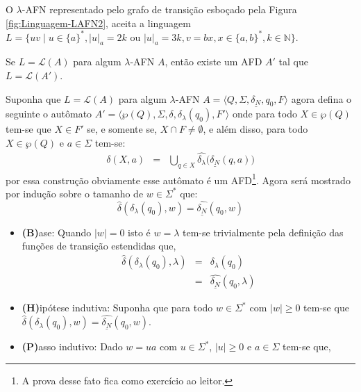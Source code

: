 \begin{exemplo}\label{exe:LinguagemLAFN2}
	O $\lambda$-AFN representado pelo grafo de transição esboçado pela Figura \ref{fig:Linguagem-LAFN2}, aceita a linguagem $L = \{uv \mid u \in \{a\}^*, |u|_a = 2k\text{ ou } |u|_a = 3k, v=bx, x \in \{a,b\}^*, k \in \mathbb{N}\}$.
\end{exemplo}

\begin{teorema}\label{teo:LAFN-AFD}
	Se $L = \mathcal{L}(A)$ para algum $\lambda$-AFN $A$, então existe um  AFD $A'$ tal que $L = \mathcal{L}(A')$.
\end{teorema}

\begin{prova}
  Suponha que $L = \mathcal{L}(A)$ para algum $\lambda$-AFN $A =  \langle Q, \Sigma, \underline{\delta_N}, q_0, F \rangle$ agora defina o seguinte o autômato $A' = \langle \wp(Q), \Sigma, \delta, \delta_\lambda(q_0), F' \rangle$ onde para todo $X \in \wp(Q)$ tem-se que $X \in F'$ se, e somente se, $X \cap F \neq \emptyset$, e além disso, para todo $X \in \wp(Q)$ e $a \in \Sigma$ tem-se:
	\begin{eqnarray}\label{eq:LAFN-AFD}
		\delta(X, a) & = & \bigcup_{q \in X} \widehat{\delta_\lambda}\Big(\underline{\delta_N}(q, a)\Big)
	\end{eqnarray}
	por essa construção obviamente esse autômato é um AFD\footnote{A prova desse fato fica como exercício ao leitor.}. Agora será mostrado por indução sobre o tamanho de $w \in \Sigma^*$ que:
	$$\widehat{\delta}(\delta_\lambda(q_0), w) = \widehat{\underline{\delta_N}}(q_0, w)$$
  \begin{itemize}
    \item[ ] \textbf{(B)}ase: Quando $|w| = 0$ isto é $w = \lambda$ tem-se trivialmente pela definição das funções de transição estendidas que, 
		\begin{eqnarray*}
			\widehat{\delta}(\delta_\lambda(q_0), \lambda) & = & \delta_\lambda(q_0)\\
			& = & \widehat{\underline{\delta_N}}(q_0, \lambda)
		\end{eqnarray*}
    \item[ ] \textbf{(H)}ipótese indutiva: Suponha que para todo $w \in \Sigma^*$ com $|w| \geq 0$ tem-se que $\widehat{\delta}(\delta_\lambda(q_0), w) = \widehat{\underline{\delta_N}}(q_0, w)$.
		\item[ ] \textbf{(P)}asso indutivo: Dado $w = ua$ com $u \in \Sigma^*$, $|u| \geq 0$ e $a \in \Sigma$ tem-se que, 

\end{itemize}
\end{prova}
